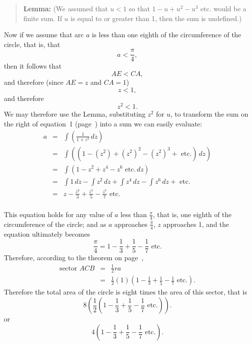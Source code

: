 \documentclass[twoside,openright]{article}
\begin{document}
\begin{enumerate}
\begin{quote} {\bf Lemma:}
 (We assumed that $u<1$ so that $1 - u + u^2 -u^3 \mbox{ etc.}$ would
 be a finite sum.  If $u$ is equal to or greater than 1, then the sum
 is undefined.)

\end{quote}
\vspace{2 ex}
 
Now if we assume that arc $a$ is less than one eighth of the
circumference of the circle, that is, that
 $$a < \frac{\pi}{4},$$
 then it follows that
$$AE < CA,$$
and therefore (since $AE = z$ and $CA =1$)
$$z<1,$$ and therefore
$$z^2<1.$$
We may therefore use the Lemma, substituting $z^2$ for $u$, to
transform the sum on the right of equation~1 (page~\pageref{ainteq})
into a sum we can easily evaluate:
\begin{eqnarray*}
  a & = &\int\! \left(\frac{1}{1+z^2}\,dz\right)\\
    & = & \int\!\left((1 -(z^2) + (z^2)^2 - (z^2)^3 + \mbox{ etc.})\,dz\right)\\
    & = & \int\!\left(1 - z^2 + z^4 -  z^6  \mbox{ etc.}\,dz \right)\\
    & = & \int\! 1\,dz - \int\! z^2\,dz + \int\!z^4\,dz - \int\! z^6\,dz +  \mbox{ etc.}\\
    & = & z - \frac{z^3}{3} + \frac{z^5}{5} -  \frac{z^7}{7} \mbox{ etc.}\\
\end{eqnarray*}
\end{enumerate}
This equation holds for any value of $a$ less than $\frac{\pi}{4}$,
that is, one eighth of the circumference of the circle; and as $a$
approaches $\frac{\pi}{4}$, $z$ approaches 1, and the equation
ultimately becomes
$$ \frac{\pi}{4}  = 1 -  \frac{1}{3} + \frac{1}{5} - \frac{1}{7} \mbox{ etc.}$$
Therefore, according to the theorem on page~\pageref{secarea}, 
\begin{eqnarray*}
  \mbox{sector }ACB & = & \frac{1}{2}ra\\
                    & = & \frac{1}{2}(1)\left(1 - \frac{1}{3} + \frac{1}{5} - \frac{1}{7} \mbox{ etc.}\right).
\end{eqnarray*}
Therefore the total area of the circle is eight times the area of this
sector, that is
$$8 \left(\frac{1}{2}\left(1 - \frac{1}{3} + \frac{1}{5} - \frac{1}{7}\mbox{ etc.}\right)\right).$$
or
$$4\left(1 - \frac{1}{3} + \frac{1}{5} - \frac{1}{7}\mbox{ etc.}\right).$$
\end{document}
